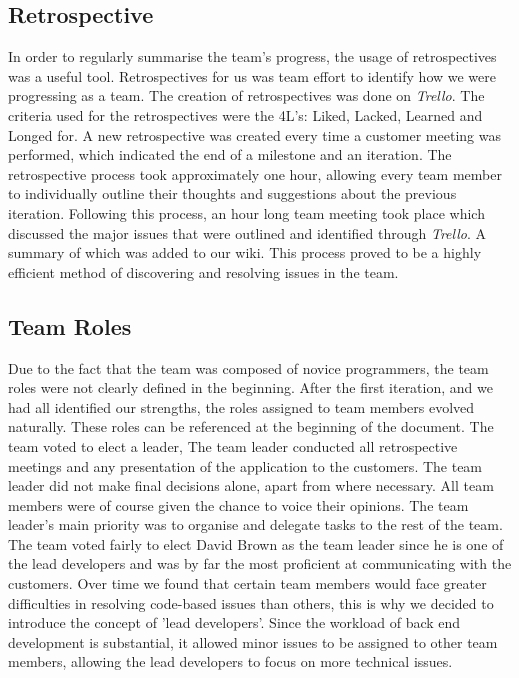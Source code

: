 \documentclass{l3proj}
\begin{document}
\subsection{Retrospective}
\label{retrospective}

In order to regularly summarise the team's progress, the usage of retrospectives was a useful tool. Retrospectives for us was team effort to identify how we were progressing as a team. The creation of retrospectives was done on \textit{Trello}. The criteria used for the retrospectives were the 4L's: Liked, Lacked, Learned and Longed for. A new retrospective was created every time a customer meeting was performed, which indicated the end of a milestone and an iteration. The retrospective process took approximately one hour, allowing every team member to individually outline their thoughts and suggestions about the previous iteration. Following this process, an hour long team meeting took place which discussed the major issues that were outlined and identified through \textit{Trello}. A summary of which was added to our wiki. This process proved to be a highly efficient method of discovering and resolving issues in the team.

\subsection{Team Roles}
\label{sec:roles}

Due to the fact that the team was composed of novice programmers, the team roles were not clearly defined in the beginning. After the first iteration, and we had all identified our strengths, the roles assigned to team members evolved naturally. These roles can be referenced at the beginning of the document. The team voted to elect a leader, The team leader conducted all retrospective meetings and any presentation of the application to the customers. The team leader did not make final decisions alone, apart from where necessary. All team members were of course given the chance to voice their opinions. The team leader's main priority was to organise and delegate tasks to the rest of the team. The team voted fairly to elect David Brown as the team leader since he is one of the lead developers and was by far the most proficient at communicating with the customers. Over time we found that certain team members would face greater difficulties in resolving code-based issues than others, this is why we decided to introduce the concept of 'lead developers'. Since the workload of back end development is substantial, it allowed minor issues to be assigned to other team members, allowing the lead developers to focus on more technical issues.
\end{document}
